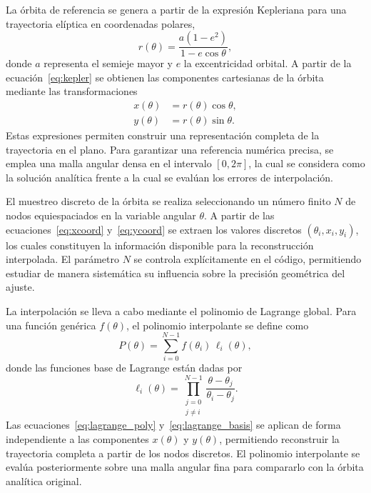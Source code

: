 \documentclass[reprint,amsmath,amssymb,aps]{revtex4-2}
\begin{document}
	La órbita de referencia se genera a partir de la expresión Kepleriana para una trayectoria elíptica en coordenadas polares,
	\begin{equation}
		r(\theta)=\frac{a(1-e^{2})}{1-e\cos\theta},
		\label{eq:kepler}
	\end{equation}
	donde $a$ representa el semieje mayor y $e$ la excentricidad orbital. A partir de la ecuación~\eqref{eq:kepler} se obtienen las componentes cartesianas de la órbita mediante las transformaciones
	\begin{align}
		x(\theta) &= r(\theta)\cos\theta, \label{eq:xcoord}\\
		y(\theta) &= r(\theta)\sin\theta. \label{eq:ycoord}
	\end{align}
	Estas expresiones permiten construir una representación completa de la trayectoria en el plano. Para garantizar una referencia numérica precisa, se emplea una malla angular densa en el intervalo $[0,2\pi]$, la cual se considera como la solución analítica frente a la cual se evalúan los errores de interpolación.
	
	El muestreo discreto de la órbita se realiza seleccionando un número finito $N$ de nodos equiespaciados en la variable angular $\theta$. A partir de las ecuaciones~\eqref{eq:xcoord} y~\eqref{eq:ycoord} se extraen los valores discretos $(\theta_i,x_i,y_i)$, los cuales constituyen la información disponible para la reconstrucción interpolada. El parámetro $N$ se controla explícitamente en el código, permitiendo estudiar de manera sistemática su influencia sobre la precisión geométrica del ajuste.
	
	La interpolación se lleva a cabo mediante el polinomio de Lagrange global. Para una función genérica $f(\theta)$, el polinomio interpolante se define como
	\begin{equation}
		P(\theta)=\sum_{i=0}^{N-1} f(\theta_i)\,\ell_i(\theta),
		\label{eq:lagrange_poly}
	\end{equation}
	donde las funciones base de Lagrange están dadas por
	\begin{equation}
		\ell_i(\theta)=\prod_{\substack{j=0 \\ j\neq i}}^{N-1}
		\frac{\theta-\theta_j}{\theta_i-\theta_j}.
		\label{eq:lagrange_basis}
	\end{equation}
	Las ecuaciones~\eqref{eq:lagrange_poly} y~\eqref{eq:lagrange_basis} se aplican de forma independiente a las componentes $x(\theta)$ y $y(\theta)$, permitiendo reconstruir la trayectoria completa a partir de los nodos discretos. El polinomio interpolante se evalúa posteriormente sobre una malla angular fina para compararlo con la órbita analítica original.
	
\end{document}
